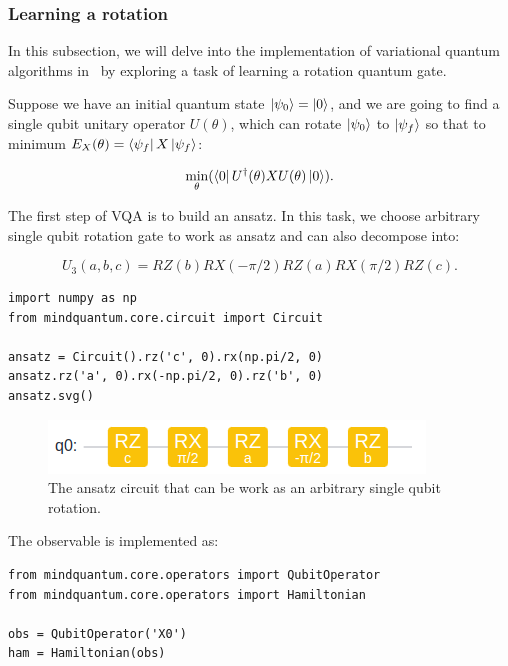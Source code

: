 \subsubsection{Learning a rotation}

In this subsection, we will delve into the implementation of variational quantum algorithms in \MindQuantum\ by exploring a task of learning a rotation quantum gate.

Suppose we have an initial quantum state $\ket{\psi_0}=\ket{0}$, and we are going to find a single qubit unitary operator $U(\theta)$, which can rotate $\ket{\psi_0}$ to $\ket{\psi_f}$ so that to minimum $E_X(\theta) = \bra{\psi_f}X\ket{\psi_f}$:

\begin{equation}
  \min_\theta(\bra{0}U^\dagger(\theta)XU(\theta)\ket{0}).
\end{equation}

The first step of VQA is to build an ansatz. In this task, we choose arbitrary single qubit rotation gate \Uthree to work as ansatz and \Uthree can also decompose into:

\begin{equation}
  U_3(a, b, c) = RZ(b)RX(-\pi/2)RZ(a)RX(\pi/2)RZ(c).
\end{equation}

\begin{lstlisting}
import numpy as np
from mindquantum.core.circuit import Circuit

ansatz = Circuit().rz('c', 0).rx(np.pi/2, 0)
ansatz.rz('a', 0).rx(-np.pi/2, 0).rz('b', 0)
ansatz.svg()
\end{lstlisting}

\begin{figure}[h]
  \begin{center}
    \includegraphics[width=0.9\linewidth]{images/3_1_ansatz.png}
  \end{center}
  \caption{The ansatz circuit that can be work as an arbitrary single qubit rotation.}
  \label{fig:u3_ansatz}
\end{figure}

The observable is implemented as:

\begin{lstlisting}
from mindquantum.core.operators import QubitOperator
from mindquantum.core.operators import Hamiltonian

obs = QubitOperator('X0')
ham = Hamiltonian(obs)
\end{lstlisting}

